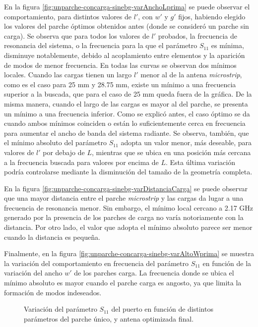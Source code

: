 En la figura \ref{fig:unparche-concarga-sinebg-varAnchoLprima} se puede observar el comportamiento, para distintos valores de $l'$, con $w'$ y $g'$ fijos, habiendo elegido los valores del parche óptimos obtenidos antes (donde se consideró un parche sin carga). Se observa que para todos los valores de $l'$ probados, la frecuencia de resonancia del sistema, o la frecuencia para la que el parámetro $S_{11}$ es mínima, disminuye notablemente, debido al acoplamiento entre elementos y la aparición de modos de menor frecuencia. En todas las curvas se observan dos mínimos locales. Cuando las cargas tienen un largo $l'$ menor al de la antena \textit{microstrip}, como es el caso para 25 mm y 28.75 mm, existe un mínimo a una frecuencia superior a la buscada, que para el caso de 25 mm queda fuera de la gráfica. De la misma manera, cuando el largo de las cargas es mayor al del parche, se presenta un mínimo a una frecuencia inferior. Como se explicó antes, el caso óptimo se da cuando ambos mínimos coinciden o están lo suficientemente cerca en frecuencia para aumentar el ancho de banda del sistema radiante. Se observa, también, que el mínimo absoluto del parámetro $S_{11}$ adopta un valor menor, más deseable, para valores de $l'$ por debajo de $L$, mientras que se ubica en una posición más cercana a la frecuencia buscada para valores por encima de $L$. Esta última variación podría controlarse mediante la disminución del tamaño de la geometría completa.

En la figura \ref{fig:unparche-concarga-sinebg-varDistanciaCarga} se puede observar que una mayor distancia entre el parche \textit{microstrip} y las cargas da lugar a una frecuencia de resonancia menor. Sin embargo, el mínimo local cercano a 2.17 GHz generado por la presencia de los parches de carga no varía notoriamente con la distancia. Por otro lado, el valor que adopta el mínimo absoluto parece ser menor cuando la distancia es pequeña.

Finalmente, en la figura \ref{fig:unparche-concarga-sinebg-varAltoWprima} se muestra la variación del comportamiento en frecuencia del parámetro $S_{11}$ en función de la variación del ancho $w'$ de los parches carga. La frecuencia donde se ubica el mínimo absoluto es mayor cuando el parche carga es angosto, ya que limita la formación de modos indeseados.

\begin{figure}[H]
	\centering 
	\caption{Variación del parámetro $S_{11}$ del puerto en función de distintos parámetros del parche único, y antena optimizada final.}
	\label{fig:simulaciones-microstrip-1parchecargado}
\end{figure}

